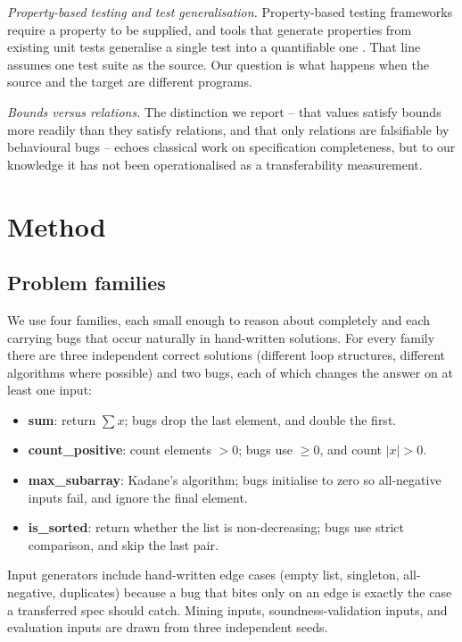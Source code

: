 \documentclass[conference]{IEEEtran}
\begin{document}
\textit{Property-based testing and test generalisation.} Property-based testing frameworks
require a property to be supplied, and tools that generate properties from existing unit
tests generalise a single test into a quantifiable one \cite{teralizer,quickrest}. That
line assumes one test suite as the source. Our question is what happens when the source and
the target are different programs.

\textit{Bounds versus relations.} The distinction we report -- that values satisfy bounds
more readily than they satisfy relations, and that only relations are falsifiable by
behavioural bugs -- echoes classical work on specification completeness, but to our
knowledge it has not been operationalised as a transferability measurement.

\section{Method}

\subsection{Problem families}

We use four families, each small enough to reason about completely and each carrying bugs
that occur naturally in hand-written solutions. For every family there are three
independent correct solutions (different loop structures, different algorithms where
possible) and two bugs, each of which changes the answer on at least one input:

\begin{itemize}
\item \textbf{sum}: return $\sum x$; bugs drop the last element, and double the first.
\item \textbf{count\_positive}: count elements $>0$; bugs use $\ge 0$, and count $|x|>0$.
\item \textbf{max\_subarray}: Kadane's algorithm; bugs initialise to zero so all-negative
inputs fail, and ignore the final element.
\item \textbf{is\_sorted}: return whether the list is non-decreasing; bugs use strict
comparison, and skip the last pair.
\end{itemize}

Input generators include hand-written edge cases (empty list, singleton, all-negative,
duplicates) because a bug that bites only on an edge is exactly the case a transferred spec
should catch. Mining inputs, soundness-validation inputs, and evaluation inputs are drawn
from three independent seeds.
\end{document}
